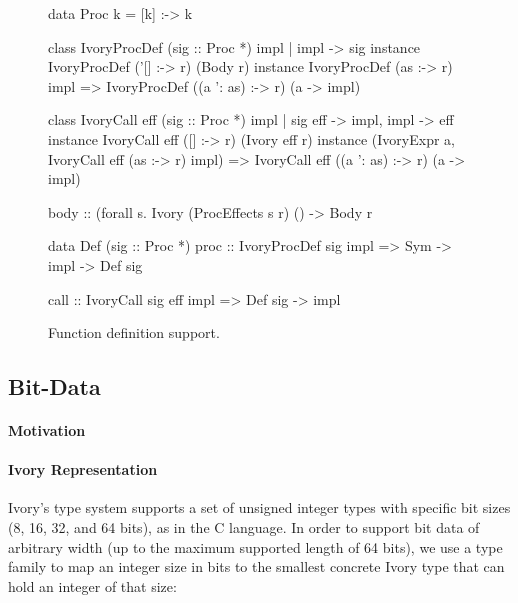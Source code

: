 \begin{figure}[h]
\begin{code}
data Proc k = [k] :-> k

class IvoryProcDef (sig :: Proc *) impl | impl -> sig
instance IvoryProcDef ('[] :-> r) (Body r)
instance IvoryProcDef (as :-> r) impl
  => IvoryProcDef ((a ': as) :-> r) (a -> impl)

class IvoryCall eff (sig :: Proc *) impl
  | sig eff -> impl, impl -> eff
instance IvoryCall eff ([] :-> r) (Ivory eff r)
instance (IvoryExpr a, IvoryCall eff (as :-> r) impl)
  => IvoryCall eff ((a ': as) :-> r) (a -> impl)

body :: (forall s. Ivory (ProcEffects s r) () -> Body r

data Def (sig :: Proc *)
proc :: IvoryProcDef sig impl
     => Sym -> impl -> Def sig

call :: IvoryCall sig eff impl => Def sig -> impl
\end{code}
\caption{Function definition support.}
\label{fig:proc-defs}
\end{figure}


\subsection{Bit-Data}
\label{sec:bitdata}

\paragraph{Motivation}

\paragraph{Ivory Representation}
Ivory's type system supports a set of unsigned integer types with
specific bit sizes (8, 16, 32, and 64 bits), as in the C language.
In order to support bit data of arbitrary width (up to the maximum
supported length of 64 bits), we use a type family
 to map an integer size in bits to the smallest
concrete Ivory type that can hold an integer of that size:

